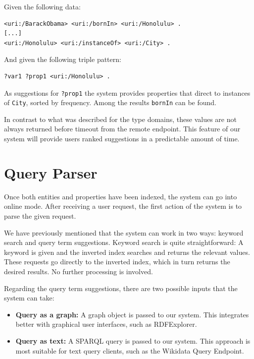 \begin{example}
Given the following data:
\begin{verbatim}
<uri:/BarackObama> <uri:/bornIn> <uri:/Honolulu> .
[...]
<uri:/Honolulu> <uri:/instanceOf> <uri:/City> .
\end{verbatim}

And given the following triple pattern:
\begin{verbatim}
?var1 ?prop1 <uri:/Honolulu> .
\end{verbatim}

As suggestions for \texttt{?prop1} the system provides properties that direct to instances of \texttt{City}, sorted by frequency. Among the results \texttt{bornIn} can be found.

In contrast to what was described for the type domains, these values are not always returned before timeout from the remote endpoint. This feature of our system will provide users ranked suggestions in a predictable amount of time.
\end{example}

\section{Query Parser}
\label{chap:parser}

Once both entities and properties have been indexed, the system can go into online mode. After receiving a user request, the first action of the system is to parse the given request.

We have previously mentioned that the system can work in two ways: keyword search and query term suggestions. Keyword search is quite straightforward: A keyword is given and the inverted index searches and returns the relevant values. These requests go directly to the inverted index, which in turn returns the desired results. No further processing is involved.

Regarding the query term suggestions, there are two possible inputs that the system can take:
\begin{itemize}
    \item \textbf{Query as a graph:} A graph object is passed to our system. This integrates better with graphical user interfaces, such as RDFExplorer.
    \item \textbf{Query as text:} A SPARQL query is passed to our system. This approach is most suitable for text query clients, such as the Wikidata Query Endpoint.
\end{itemize}

